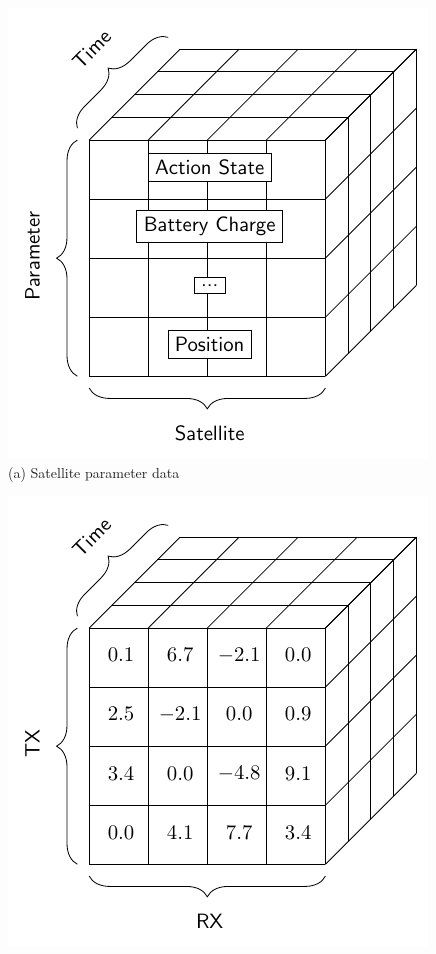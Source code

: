 \documentclass[conference]{IEEEtran}
\begin{document}
\begin{figure}[t]
  \begin{minipage}[b]{0.49\linewidth}
    \begin{center}
      \includegraphics[width=\textwidth]{images/params.pdf}
      {\footnotesize(a) Satellite parameter data}
    \end{center}
  \end{minipage}
  \begin{minipage}[b]{0.49\linewidth}
    \begin{center}
      \includegraphics[width=\textwidth]{images/weighted.pdf}

\end{center}
\end{minipage}
\end{figure}
\end{document}
